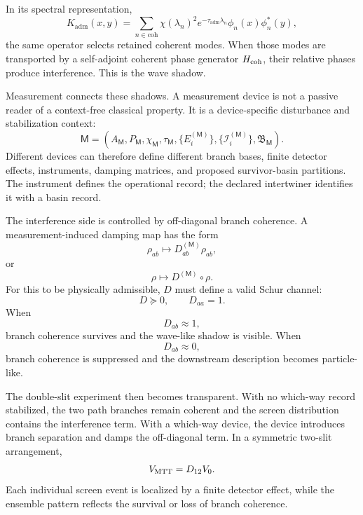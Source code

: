 \documentclass[11pt]{article}
\newcommand{\Kadm}{K_{\mathrm{adm}}}
\newcommand{\ta}{\tau_{\mathrm{adm}}}
\newcommand{\coh}{\mathrm{coh}}
\newcommand{\Meas}{\mathsf M}
\begin{document}
In its spectral representation,
\begin{equation}
  \Kadm(x,y)
  =
  \sum_{n\in\coh}
  \chi(\lambda_n)^2e^{-\ta\lambda_n}
  \phi_n(x)\phi_n^\ast(y),
\end{equation}
the same operator selects retained coherent modes. When those modes are transported by a
self-adjoint coherent phase generator \(H_{\rm coh}\), their relative phases produce
interference. This is the wave shadow.

Measurement connects these shadows. A measurement device is not a passive reader of a
context-free classical property. It is a device-specific disturbance and stabilization context:
\begin{equation}
  \Meas
  =
  (A_{\Meas},P_{\Meas},\chi_{\Meas},\tau_{\Meas},
  \{E_i^{(\Meas)}\},\{\mathcal I_i^{(\Meas)}\},\mathfrak B_{\Meas}).
\end{equation}
Different devices can therefore define different branch bases, finite detector effects,
instruments, damping matrices, and proposed survivor-basin partitions. The instrument
defines the operational record; the declared intertwiner identifies it with a basin record.

The interference side is controlled by off-diagonal branch coherence. A measurement-induced
damping map has the form
\begin{equation}
  \rho_{ab}\longmapsto D_{ab}^{(\Meas)}\rho_{ab},
\end{equation}
or
\begin{equation}
  \rho\longmapsto D^{(\Meas)}\circ\rho.
\end{equation}
For this to be physically admissible, \(D\) must define a valid Schur channel:
\begin{equation}
  D\succeq0,
  \qquad
  D_{aa}=1.
\end{equation}
When
\begin{equation}
  D_{ab}\approx1,
\end{equation}
branch coherence survives and the wave-like shadow is visible. When
\begin{equation}
  D_{ab}\approx0,
\end{equation}
branch coherence is suppressed and the downstream description becomes particle-like.

The double-slit experiment then becomes transparent. With no which-way record stabilized,
the two path branches remain coherent and the screen distribution contains the interference
term. With a which-way device, the device introduces branch separation and damps the
off-diagonal term. In a symmetric two-slit arrangement,
\begin{equation}
  V_{\rm MTT}
  =
  D_{12}V_0.
\end{equation}
Each individual screen event is localized by a finite detector effect, while the ensemble
pattern reflects the survival or loss of branch coherence.
\end{document}
